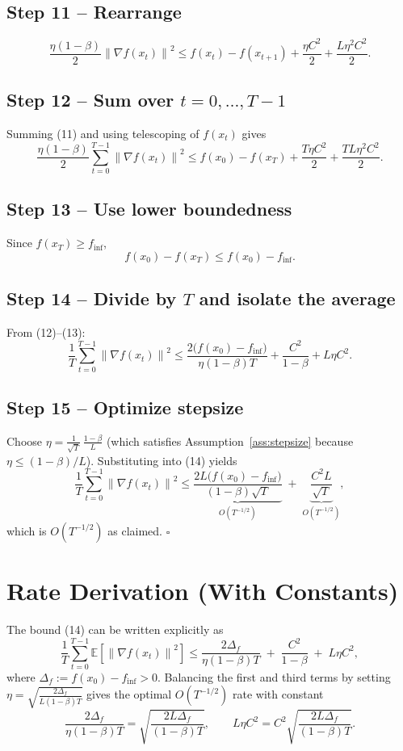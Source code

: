 \documentclass{article}
\newcommand{\E}{\mathbb{E}}
\newcommand{\norm}[1]{\left\lVert #1\right\rVert}
\newcommand{\grad}{\nabla}
\begin{document}
\subsection*{Step 11 – Rearrange}
\[
\frac{\eta(1-\beta)}{2}\norm{\grad f(x_t)}^2
\le f(x_t)-f(x_{t+1}) + \frac{\eta C^2}{2}+ \frac{L\eta^2 C^2}{2}.
\tag{11}
\]

\subsection*{Step 12 – Sum over $t=0,\dots,T-1$}
Summing (11) and using telescoping of $f(x_t)$ gives
\[
\frac{\eta(1-\beta)}{2}\sum_{t=0}^{T-1}\norm{\grad f(x_t)}^2
\le f(x_0)-f(x_T) + \frac{T\eta C^2}{2}+ \frac{TL\eta^2 C^2}{2}.
\tag{12}
\]

\subsection*{Step 13 – Use lower boundedness}
Since $f(x_T)\ge f_{\inf}$,
\[
f(x_0)-f(x_T) \le f(x_0)-f_{\inf}.
\tag{13}
\]

\subsection*{Step 14 – Divide by $T$ and isolate the average}
From (12)–(13):
\[
\frac{1}{T}\sum_{t=0}^{T-1}\norm{\grad f(x_t)}^2
\le
\frac{2\bigl(f(x_0)-f_{\inf}\bigr)}{\eta(1-\beta)T}
+ \frac{C^2}{1-\beta}
+ L\eta C^2 .
\tag{14}
\]

\subsection*{Step 15 – Optimize stepsize}
Choose $\eta = \frac{1}{\sqrt{T}}\,\frac{1-\beta}{L}$ (which satisfies Assumption~\ref{ass:stepsize} because $\eta\le (1-\beta)/L$). Substituting into (14) yields
\[
\frac{1}{T}\sum_{t=0}^{T-1}\norm{\grad f(x_t)}^2
\le
\underbrace{\frac{2L\bigl(f(x_0)-f_{\inf}\bigr)}{(1-\beta)\sqrt{T}}}_{O(T^{-1/2})}
\;+\;
\underbrace{\frac{C^2 L}{\sqrt{T}}}_{O(T^{-1/2})},
\]
which is $O(T^{-1/2})$ as claimed. \hfill $\square$

\section*{Rate Derivation (With Constants)}
The bound (14) can be written explicitly as
\[
\boxed{
\frac{1}{T}\sum_{t=0}^{T-1}\E\!\left[\norm{\grad f(x_t)}^2\right]
\le
\frac{2\Delta_f}{\eta(1-\beta)T}
\;+\;
\frac{C^2}{1-\beta}
\;+\;
L\eta C^2,
}
\]
where $\Delta_f:=f(x_0)-f_{\inf}>0$.  
Balancing the first and third terms by setting $\eta = \sqrt{\frac{2\Delta_f}{L(1-\beta)T}}$ gives the optimal $O(T^{-1/2})$ rate with constant
\[
\frac{2\Delta_f}{\eta(1-\beta)T}= \sqrt{\frac{2L\Delta_f}{(1-\beta)T}} ,
\qquad
L\eta C^2 = C^2\sqrt{\frac{2L\Delta_f}{(1-\beta)T}} .
\]
\end{document}
